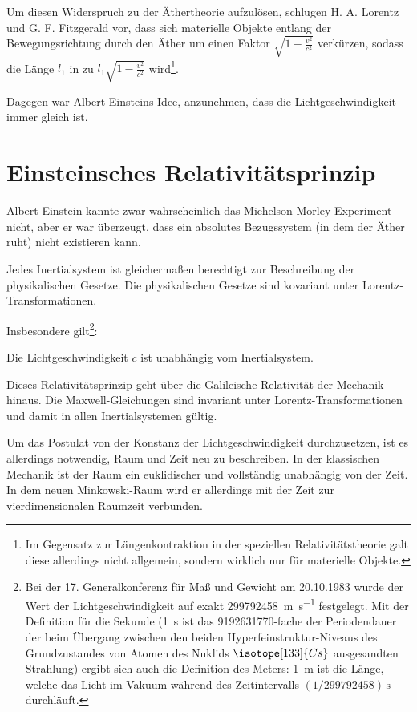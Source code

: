 Um diesen Widerspruch zu der Äthertheorie aufzulösen, schlugen H. A. Lorentz und G. F. Fitzgerald vor, dass sich materielle Objekte entlang der Bewegungsrichtung durch den Äther um einen Faktor $\sqrt{1-\frac{v^2}{c^2}}$ verkürzen,
sodass die Länge $l_1$ in  zu $l_1\sqrt{1-\frac{v^2}{c^2}}$ wird\footnote{Im Gegensatz zur Längenkontraktion in der speziellen Relativitätstheorie galt diese allerdings nicht allgemein, sondern wirklich nur für materielle Objekte.}.

Dagegen war Albert Einsteins Idee, anzunehmen, dass die Lichtgeschwindigkeit immer gleich ist.




\section{Einsteinsches Relativitätsprinzip}

Albert Einstein kannte zwar wahrscheinlich das Michelson-Morley-Experiment nicht, aber er war überzeugt, dass ein absolutes Bezugssystem (in dem der Äther ruht) nicht existieren kann.

\begin{formal}
    Jedes Inertialsystem ist gleichermaßen berechtigt zur Beschreibung der physikalischen Gesetze. Die physikalischen Gesetze sind kovariant unter Lorentz-Transformationen.
\end{formal}

Insbesondere gilt\footnote{Bei der 17. Generalkonferenz für Maß und Gewicht am 20.10.1983 wurde der Wert der Lichtgeschwindigkeit auf exakt \SI{299 792 458}{\m\per\s} festgelegt.
    Mit der Definition für die Sekunde (\SI{1}{\s} ist das 9192631770-fache der Periodendauer der beim Übergang zwischen den beiden Hyperfeinstruktur-Niveaus des Grundzustandes von Atomen des Nuklids $\isotope[133]{Cs}$ ausgesandten Strahlung) ergibt sich auch die Definition des Meters: \SI{1}{\m} ist die Länge, welche das Licht im Vakuum während des Zeitintervalls $(1/299792458)\,\si{\s}$ durchläuft.}:

\begin{formal}
    Die Lichtgeschwindigkeit $c$ ist unabhängig vom Inertialsystem.
\end{formal}

Dieses Relativitätsprinzip geht über die Galileische Relativität der Mechanik hinaus.
Die Maxwell-Gleichungen sind invariant unter Lorentz-Transformationen und damit in allen Inertialsystemen gültig.

Um das Postulat von der Konstanz der Lichtgeschwindigkeit durchzusetzen, ist es allerdings notwendig, Raum und Zeit neu zu beschreiben.
In der klassischen Mechanik ist der Raum ein euklidischer und vollständig unabhängig von der Zeit. In dem neuen Minkowski-Raum wird er allerdings mit der Zeit zur vierdimensionalen Raumzeit verbunden.

